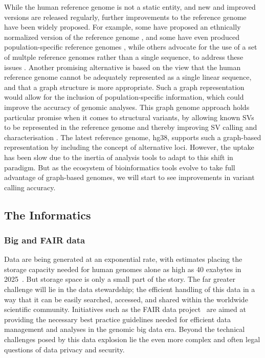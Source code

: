 While the human reference genome is not a static entity, and new and improved versions are released regularly, further improvements to the reference genome have been widely proposed.
For example, some have proposed an ethnically normalized version of the reference genome \cite{shukla2019hg19kindel}, and some have even produced population-specific reference genomes \cite{cho2016ethnically}, while others advocate for the use of a set of multple reference genomes rather than a single sequence, to address these issues \cite{schneeberger2009simultaneous,paten2017genome}.
Another promising alternative is based on the view that the human reference genome cannot be adequately represented as a single linear sequence, and that a graph structure is more appropriate.
Such a graph representation would allow for the inclusion of population-specific information, which could improve the accuracy of genomic analyses.
This graph genome approach holds particular promise when it comes to structural variants, by allowing known SVs to be represented in the reference genome and thereby improving SV calling and characterisation \cite{rakocevic2019fast}.
The latest reference genome, hg38, supports such a graph-based representation by including the concept of alternative loci.
However, the uptake has been slow due to the inertia of analysis tools to adapt to this shift in paradigm. But as the ecosystem of bioinformatics tools evolve to take full advantage of graph-based genomes, we will start to see improvements in variant calling accuracy.

\subsection{The Informatics}
\subsubsection{Big and FAIR data}
Data are being generated at an exponential rate, with estimates placing the storage capacity needed for human genomes alone as high as 40 exabytes in 2025~\cite{stephens2015}.
But storage space is only a small part of the story. The far greater challenge will lie in the data stewardship; the efficient handling of this data in a way that it can be easily searched, accessed, and shared within the worldwide scientific community.
Initiatives such as the FAIR data project~\cite{wilkinson2016fair} are aimed at providing the necessary best practice guidelines needed for efficient data management and analyses in the genomic big data era. Beyond the technical challenges posed by this data explosion lie the even more complex and often legal questions of data privacy and security.

